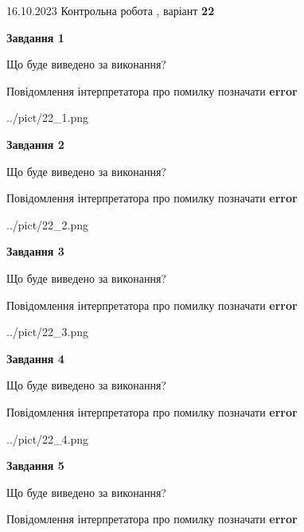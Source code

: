 \documentclass[12pt, ukrainian]{article}
\begin{document}
{\Large{16.10.2023 Контрольна робота , варіант  \No \textbf { 22 }\par}}
{
\begin {large}
{\begin {center}\textbf{Завдання 1}\end {center}}\par
Що буде виведено за виконання? \par
Повідомлення інтерпретатора про помилку позначати \textbf{error}

\begin{center}
	{../pict/22_1.png}
\end{center}
\newpage

{\begin {center}\textbf{Завдання 2}\end {center}}\par
Що буде виведено за виконання? \par
Повідомлення інтерпретатора про помилку позначати \textbf{error}

\begin{center}
	{../pict/22_2.png}
\end{center}
\newpage

{\begin {center}\textbf{Завдання 3}\end {center}}\par
Що буде виведено за виконання? \par
Повідомлення інтерпретатора про помилку позначати \textbf{error}

\begin{center}
	{../pict/22_3.png}
\end{center}
\newpage

{\begin {center}\textbf{Завдання 4}\end {center}}\par
Що буде виведено за виконання? \par
Повідомлення інтерпретатора про помилку позначати \textbf{error}

\begin{center}
	{../pict/22_4.png}
\end{center}
\newpage

{\begin {center}\textbf{Завдання 5}\end {center}}\par
Що буде виведено за виконання? \par
Повідомлення інтерпретатора про помилку позначати \textbf{error}


\end{large}}
\end{document}
